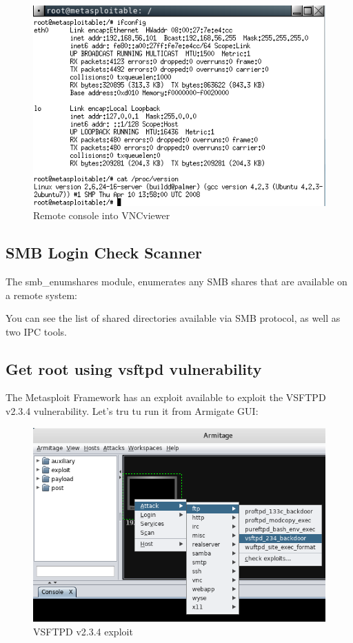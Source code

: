 \documentclass[14pt,a4paper,report]{report}
\begin{document}
\begin{figure}[h!]
	\centering
	\includegraphics[scale = 0.84]{images/5.png}
	\caption{Remote console into VNCviewer}
\end{figure}

\subsection{SMB Login Check Scanner}

The smb\_enumshares module, enumerates any SMB shares that are available on a remote system:



You can see the list of shared directories available via SMB protocol, as well as two IPC tools.

\subsection{Get root using vsftpd vulnerability}

The Metasploit Framework has an exploit available to exploit the VSFTPD v2.3.4 vulnerability. Let's tru tu run it from Armigate GUI:

\begin{figure}[h!]
	\centering
	\includegraphics[scale = 0.90]{images/6.png}
	\caption{VSFTPD v2.3.4 exploit}
\end{figure}
\end{document}

